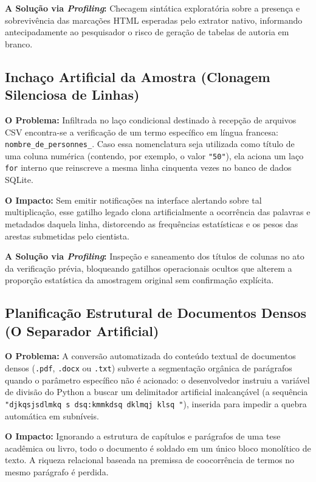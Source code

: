 \documentclass[
	oneside,
	a4paper,
	12pt,
	chapter=TITLE,
	section=TITLE,
	english,
	brazilian
]{abntex2}
\begin{document}
\begin{apendicesenv}
\textbf{A Solução via \textit{Profiling}:} Checagem sintática exploratória sobre a presença e sobrevivência das marcações HTML esperadas pelo extrator nativo, informando antecipadamente ao pesquisador o risco de geração de tabelas de autoria em branco.

\FloatBarrier
\subsection{Inchaço Artificial da Amostra (Clonagem Silenciosa de Linhas)}\label{sec:inchaco_artificial_da_amostra_clonagem_s}


\textbf{O Problema:} Infiltrada no laço condicional destinado à recepção de arquivos CSV encontra-se a verificação de um termo específico em língua francesa: \texttt{nombre\_\allowbreak de\_\allowbreak personnes\_\allowbreak }. Caso essa nomenclatura seja utilizada como título de uma coluna numérica (contendo, por exemplo, o valor \texttt{"50"}), ela aciona um laço \texttt{for} interno que reinscreve a mesma linha cinquenta vezes no banco de dados SQLite.

\textbf{O Impacto:} Sem emitir notificações na interface alertando sobre tal multiplicação, esse gatilho legado clona artificialmente a ocorrência das palavras e metadados daquela linha, distorcendo as frequências estatísticas e os pesos das arestas submetidas pelo cientista.

\textbf{A Solução via \textit{Profiling}:} Inspeção e saneamento dos títulos de colunas no ato da verificação prévia, bloqueando gatilhos operacionais ocultos que alterem a proporção estatística da amostragem original sem confirmação explícita.

\FloatBarrier
\subsection{Planificação Estrutural de Documentos Densos (O Separador Artificial)}\label{sec:planificacao_estrutural_de_documentos_de}


\textbf{O Problema:} A conversão automatizada do conteúdo textual de documentos densos (\texttt{.pdf}, \texttt{.docx} ou \texttt{.txt}) subverte a segmentação orgânica de parágrafos quando o parâmetro específico não é acionado: o desenvolvedor instruiu a variável de divisão do Python a buscar um delimitador artificial inalcançável (a sequência \texttt{"djkqsjsdlmkq s dsq:kmmkdsq dklmqj klsq "}), inserida para impedir a quebra automática em subníveis.

\textbf{O Impacto:} Ignorando a estrutura de capítulos e parágrafos de uma tese acadêmica ou livro, todo o documento é soldado em um único bloco monolítico de texto. A riqueza relacional baseada na premissa de coocorrência de termos no mesmo parágrafo é perdida.


\end{apendicesenv}
\end{document}
